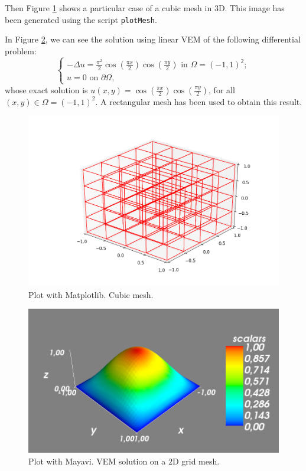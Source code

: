 Then Figure \ref{img:matplotlibMesh} shows a particular case of a cubic mesh in $3$D. This image has been generated using the script \verb|plotMesh|. 

In Figure \ref{img:mayavi2D}, we can see the solution using linear VEM of the following differential problem:
\begin{equation*}
\begin{cases}
-\Delta u = \frac{\pi^2}{2}\cos\left(\frac{\pi x}{2}\right)\cos\left(\frac{\pi y}{2}\right) \text{ in } \Omega=(-1,1)^2;\\
u = 0 \text{ on } \partial \Omega,
\end{cases}
\end{equation*}
whose exact solution is $u(x,y)=\cos\left(\frac{\pi x}{2}\right)\cos\left(\frac{\pi y}{2}\right)$, for all $(x,y)\in \Omega=(-1,1)^2$. A rectangular mesh has been used to obtain this result. 

\begin{figure}[!h]
\centering
\includegraphics[scale=0.4]{images/matplotlibPlotMesh.png}
\caption{Plot with Matplotlib. Cubic mesh.}
\label{img:matplotlibMesh}
\end{figure}

\begin{figure}[!h]
\centering
\includegraphics[scale=0.35]{images/mayavi2D.png}
\caption{Plot with Mayavi. VEM solution on a $2$D grid mesh.}
\label{img:mayavi2D}
\end{figure}

